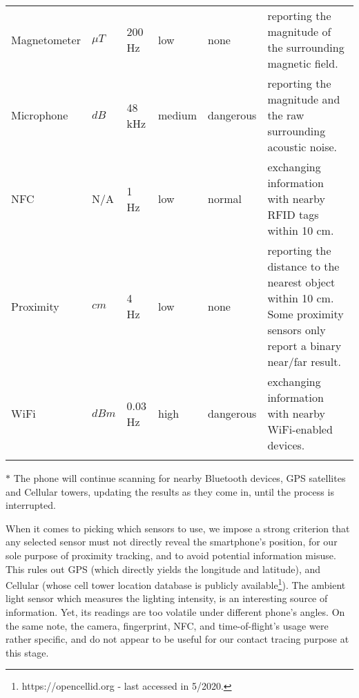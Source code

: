 \documentclass[graybox]{svmult}
\begin{document}
\begin{table}[!ht]
\begin{tabular}{p{2cm}p{1.3cm}p{1.5cm}p{1.3cm}p{1.6cm}p{6cm}}
		Magnetometer & $\mu T$ & 200 Hz & low & none & reporting the magnitude of the surrounding magnetic field. \\ \addlinespace[0.2cm]
		
		Microphone & $dB$ & 48 kHz & medium & dangerous & reporting the magnitude and the raw surrounding acoustic noise. \\ \addlinespace[0.2cm]
		
		NFC & N/A & 1 Hz & low & normal & exchanging information with nearby RFID tags within 10 cm. \\ \addlinespace[0.2cm]
		
		Proximity & $cm$ & 4 Hz & low & none & reporting the distance to the nearest object within 10 cm. Some proximity sensors only report a binary near/far result. \\ \addlinespace[0.2cm]
		
		
		
		
		WiFi & $dBm$ & 0.03 Hz & high & dangerous & exchanging information with nearby WiFi-enabled devices. \\ \addlinespace[0.2cm]
		\bottomrule
	\end{tabular}
	
	$*$ The phone will continue scanning for nearby Bluetooth devices, GPS satellites and Cellular towers, updating the results as they come in, until the process is interrupted.
	\label{comparisonsensors}
\end{table}

When it comes to picking which sensors to use, we impose a strong criterion that any selected sensor must not directly reveal the smartphone's position, for our sole purpose of proximity tracking, and to avoid potential information misuse. This rules out GPS (which directly yields the longitude and latitude), and Cellular (whose cell tower location database is publicly available\footnote{https://opencellid.org - last accessed in 5/2020.}). The ambient light sensor which measures the lighting intensity, is an interesting source of information. Yet, its readings are too volatile under different phone's angles. On the same note, the camera, fingerprint, NFC, and time-of-flight's usage were rather specific, and do not appear to be useful for our contact tracing purpose at this stage.
\end{document}
